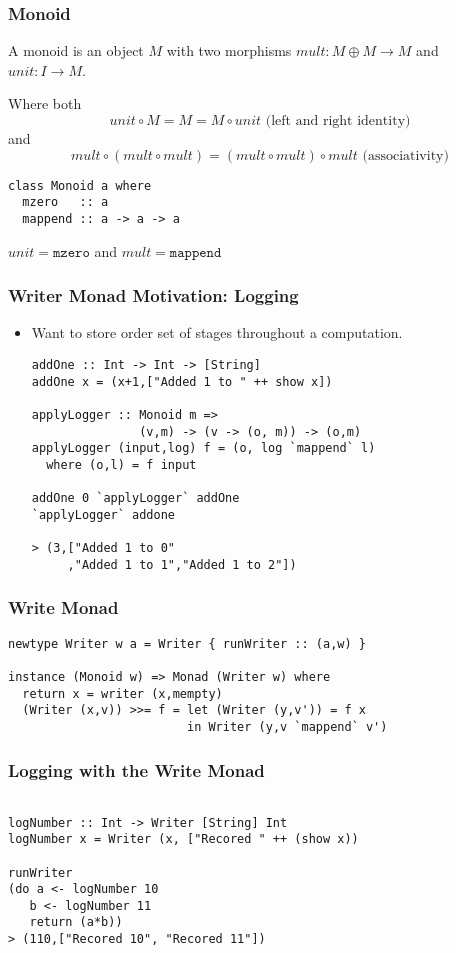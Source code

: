 \documentclass{beamer} %
\begin{document}
\begin{frame}[fragile]\frametitle{Monoid}
    A monoid is an object $M$ with two morphisms $\mathit{mult}: M \oplus M \rightarrow M$ and $\mathit{unit} : I \rightarrow M$. 

    Where both \[\mathit{unit} \circ M = M = M \circ \mathit{unit} \text{ (left and right
        identity)}\] and
    \[ \mathit{mult} \circ (\mathit{mult} \circ \mathit{mult}) = (\mathit{mult} \circ \mathit{mult})
    \circ \mathit{mult} \text{ (associativity)} \]

\begin{verbatim}
class Monoid a where 
  mzero   :: a
  mappend :: a -> a -> a
\end{verbatim}
$\mathit{unit} = \texttt{mzero}$ and $\mathit{mult} = \texttt{mappend}$
\end{frame}

\begin{frame}[fragile]\frametitle{Writer Monad Motivation: Logging}
  \begin{itemize}
    \item Want to store order set of stages throughout a computation.
\begin{verbatim}
addOne :: Int -> Int -> [String]
addOne x = (x+1,["Added 1 to " ++ show x])

applyLogger :: Monoid m => 
               (v,m) -> (v -> (o, m)) -> (o,m)
applyLogger (input,log) f = (o, log `mappend` l)
  where (o,l) = f input

addOne 0 `applyLogger` addOne 
`applyLogger` addone

> (3,["Added 1 to 0"
     ,"Added 1 to 1","Added 1 to 2"])
\end{verbatim}
  \end{itemize}
\end{frame}

\begin{frame}[fragile]\frametitle{Write Monad}
\begin{verbatim}
newtype Writer w a = Writer { runWriter :: (a,w) }

instance (Monoid w) => Monad (Writer w) where
  return x = writer (x,mempty)
  (Writer (x,v)) >>= f = let (Writer (y,v')) = f x 
                         in Writer (y,v `mappend` v')
\end{verbatim}
\end{frame}

\begin{frame}[fragile]\frametitle{Logging with the Write Monad}
\begin{verbatim}

logNumber :: Int -> Writer [String] Int
logNumber x = Writer (x, ["Recored " ++ (show x))

runWriter 
(do a <- logNumber 10
   b <- logNumber 11
   return (a*b))
> (110,["Recored 10", "Recored 11"])
\end{verbatim}
\end{frame}
\end{document}
